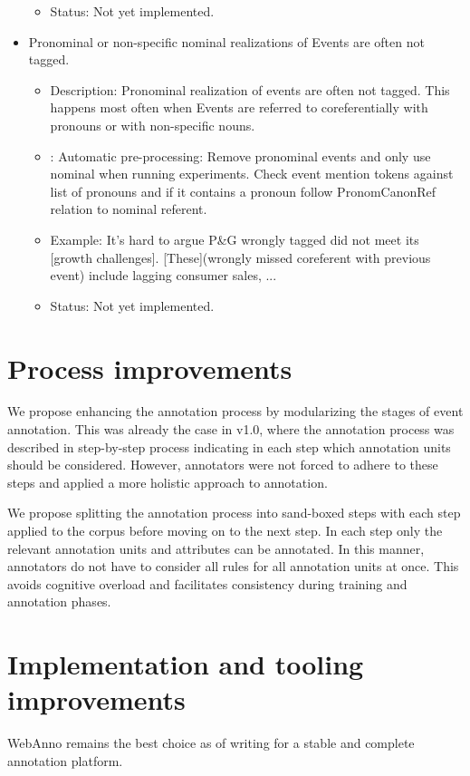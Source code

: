 \begin{itemize}[leftmargin=*]
\begin{itemize}
            \item Status: Not yet implemented.
    \end{itemize}
    \item Pronominal or non-specific nominal realizations of Events are often not tagged.
        \begin{itemize} 
            \item Description: Pronominal realization of events are often not tagged. This happens most often when Events are referred to coreferentially with pronouns or with non-specific nouns.
            \item: Automatic pre-processing: Remove pronominal events and only use nominal when running experiments. Check event mention tokens against list of pronouns and if it contains a pronoun follow PronomCanonRef relation to nominal referent.
            \item Example: It's hard to argue P\&G wrongly tagged did not meet its [growth challenges]. [These](wrongly missed coreferent with previous event) include lagging consumer sales, ...
            \item Status: Not yet implemented.
    \end{itemize}
\end{itemize}

\section{Process improvements}
We propose enhancing the annotation process by modularizing the stages of event annotation.
This was already the case in \scheme v1.0, where the annotation process was described in step-by-step process indicating in each step which annotation units should be considered.
However, annotators were not forced to adhere to these steps and applied a more holistic approach to annotation.

We propose splitting the annotation process into sand-boxed steps with each step applied to the corpus before moving on to the next step.
In each step only the relevant annotation units and attributes can be annotated.
In this manner, annotators do not have to consider all rules for all annotation units at once.
This avoids cognitive overload and facilitates consistency during training and annotation phases.

\section{Implementation and tooling improvements}
WebAnno remains the best choice as of writing for a stable and complete annotation platform.